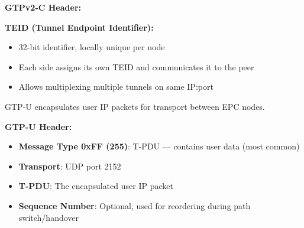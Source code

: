 
\textbf{GTPv2-C Header:}


\textbf{TEID (Tunnel Endpoint Identifier):}

\begin{itemize}
\tightlist
\item
  32-bit identifier, locally unique per node
\item
  Each side assigns its own TEID and communicates it to the peer
\item
  Allows multiplexing multiple tunnels on same IP:port
\end{itemize}



GTP-U encapsulates user IP packets for transport between EPC nodes.

\textbf{GTP-U Header:}


\begin{itemize}
\tightlist
\item
  \textbf{Message Type 0xFF (255)}: T-PDU — contains user data (most common)
\item
  \textbf{Transport}: UDP port 2152
\item
  \textbf{T-PDU}: The encapsulated user IP packet
\item
  \textbf{Sequence Number}: Optional, used for reordering during path switch/\allowbreak{}handover
\end{itemize}



